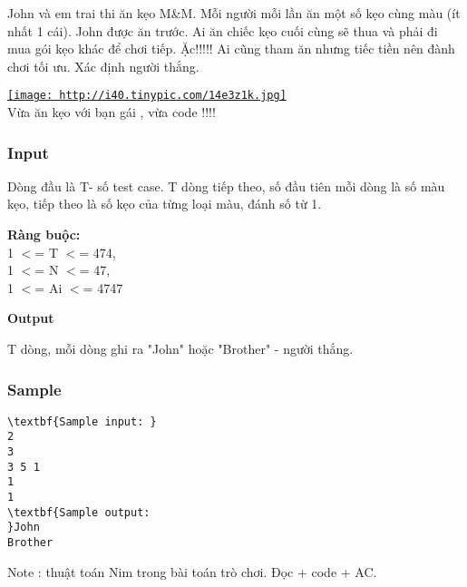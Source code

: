 

John và em trai thi ăn kẹo M\&M. Mỗi người mỗi lần ăn một số kẹo cùng màu (ít nhất 1 cái). John được ăn trước. Ai ăn chiếc kẹo cuối cùng sẽ thua và phải đi mua gói kẹo khác để chơi tiếp. Ặc!!!!! Ai cũng tham ăn nhưng tiếc tiền nên đành chơi tối ưu. Xác định người thắng.

\href{http://tinypic.com}{
\texttt{[image: http://i40.tinypic.com/14e3z1k.jpg]}}
\\Vừa ăn kẹo với bạn gái , vừa code !!!!

\subsubsection{Input}

Dòng đầu là T- số test case. T dòng tiếp theo, số đầu tiên mỗi dòng là số màu kẹo, tiếp theo là số kẹo của từng loại màu, đánh số từ 1.

\textbf{Ràng buộc:}
\\1 $<$= T $<$= 474,
\\1 $<$= N $<$= 47,
\\1 $<$= Ai $<$= 4747

\textbf{Output}

T dòng, mỗi dòng ghi ra "John" hoặc "Brother" - người thắng.

\subsubsection{Sample}
\begin{verbatim}
\textbf{Sample input: }
2 
3 
3 5 1 
1 
1 
\textbf{Sample output: 
}John 
Brother \end{verbatim}

Note : thuật toán Nim trong bài toán trò chơi. Đọc + code + AC.